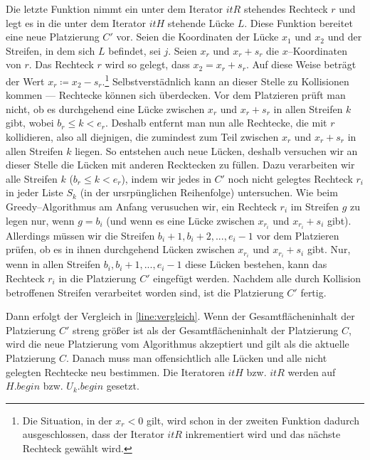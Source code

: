 Die letzte Funktion nimmt ein unter dem Iterator $itR$ stehendes Rechteck $r$
und legt es in die unter dem Iterator $itH$ stehende Lücke $L$.
Diese Funktion bereitet eine neue Platzierung $C'$ vor.
Seien die Koordinaten der Lücke $x_1$ und $x_2$ und der Streifen, in dem sich $L$ befindet, sei $j$. 
Seien $x_r$ und $x_r + s_r$ die $x$--Koordinaten von $r$.
Das Rechteck $r$ wird so gelegt, dass $x_2 = x_r + s_r$. Auf diese Weise beträgt
der Wert $x_r \coloneqq x_2 - s_r$.\footnote{Die Situation, in der $x_r < 0$ gilt, wird schon in der
zweiten Funktion dadurch ausgeschlossen, dass der Iterator $itR$ inkrementiert wird und das nächste
Rechteck gewählt wird.}
Selbstverstädnlich kann an dieser Stelle zu Kollisionen kommen --- Rechtecke können sich überdecken.
Vor dem Platzieren prüft man nicht, ob es durchgehend eine Lücke zwischen $x_r$ und $x_r + s_r$ 
in allen Streifen $k$ gibt, wobei $b_r \leqslant k < e_r$.
Deshalb entfernt man nun alle Rechtecke, die mit $r$ kollidieren, also all diejnigen, die 
zumindest zum Teil zwischen $x_r$ und $x_r + s_r$ in allen Streifen $k$ liegen.
So entstehen auch neue Lücken, deshalb versuchen wir an dieser Stelle 
die Lücken mit anderen Recktecken zu füllen.
Dazu verarbeiten wir alle Streifen $k$ ($b_r \leqslant k < e_r$), indem wir
jedes in $C'$ noch nicht gelegtes Rechteck $r_i$
in jeder Liste $S_k$ (in der ursrpünglichen Reihenfolge) untersuchen.
Wie beim Greedy--Algorithmus am Anfang verusuchen wir, ein Rechteck
$r_i$ im Streifen $g$ zu legen nur, wenn $g = b_i$
(und wenn es eine Lücke zwischen $x_{r_i}$ und $x_{r_i} + s_i$ gibt).
Allerdings müssen wir die Streifen $b_i+1, b_i+2, ..., e_i-1$ vor dem Platzieren prüfen,
ob es in ihnen durchgehend Lücken zwischen $x_{r_i}$ und $x_{r_i} + s_i$ gibt. 
Nur, wenn in allen Streifen $b_i, b_i + 1, ..., e_i-1$ diese Lücken bestehen,
kann das Rechteck $r_i$ in die Platzierung $C'$ eingefügt werden. 
Nachdem alle durch Kollision betroffenen Streifen verarbeitet worden sind,
ist die Platzierung $C'$ fertig.

Dann erfolgt der Vergleich in \cref{line:vergleich}.
Wenn der Gesamtflächeninhalt der Platzierung $C'$ streng größer ist als
der Gesamtflächeninhalt der Platzierung $C$, wird die neue Platzierung vom Algorithmus
akzeptiert und gilt als die aktuelle Platzierung $C$.
Danach muss man offensichtlich alle Lücken und alle nicht gelegten Rechtecke neu bestimmen.
Die Iteratoren $itH$ bzw. $itR$ werden auf $H.begin$ bzw. $U_k.begin$ gesetzt. 

